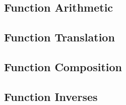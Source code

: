        \subsection{Function Arithmetic}
        \label{sect:function arithmetic}
        \subsection{Function Translation}
        \label{sect:function translation}
        \subsection{Function Composition}
        \label{sect:function composition}
        \subsection{Function Inverses}
        \label{sect:function inverses}
